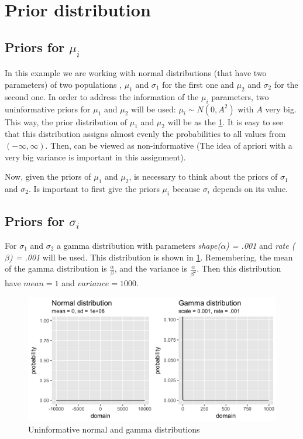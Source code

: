 \documentclass{article}
\begin{document}
\section{Prior distribution}

\subsection{Priors for $\mu_i$}
In this example we are working with normal distributions (that have two parameters) of two populations , $\mu_1$ and $\sigma_1$ for the first one and $\mu_2$ and $\sigma_2$ for the second one. In order to address the information of the $\mu_i$ parameters, two uninformative priors for $\mu_1$ and $\mu_2$ will be used: $\mu_i \sim N(0, A^2)$ with $A$ very big. This way, the prior distribution of $\mu_1$ and $\mu_2$ will be as the \cref{fig:fig1}. It is easy to see that this distribution assigns almost evenly the probabilities to all values from $(-\infty, \infty)$. Then, can be viewed as non-informative (The idea of apriori with a very big variance is important in this assignment).

Now, given the priors of $\mu_1$ and $\mu_2$, is necessary to think about the priors of $\sigma_1$ and $\sigma_2$. Is important to first give the priors $\mu_i$ because $\sigma_i$ depends on its value. 

\subsection{Priors for $\sigma_i$}
For $\sigma_1$ and $\sigma_2$ a gamma distribution with parameters \textit{shape($\alpha$) = .001} and \textit{rate ($\beta$) = .001} will be used. This distribution is shown in \cref{fig:fig1}. Remembering, the mean of the gamma distribution is $\frac{\alpha}{\beta}$, and the variance is $\frac{\alpha}{\beta^2}$. Then this distribution have $mean = 1$ and $variance = 1000$.

\begin{figure}[ht!]
  \centering
  \includegraphics[width=.8\textwidth]{imgs/00_prior_norm.png}
  \caption{Uninformative normal and gamma distributions}
  \label{fig:fig1}
\end{figure}
\end{document}
